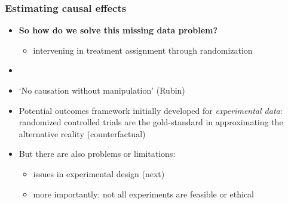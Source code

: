 \begin{frame}
\frametitle{Estimating causal effects}
\centering

\begin{itemize}
  \item \textbf{So how do we solve this missing data problem?}
  \begin{itemize}
    \item intervening in treatment assignment through randomization
  \end{itemize}
  \item[]
  \item<2-> `No causation without manipulation' (Rubin)
  \item<2-> Potential outcomes framework initially developed for \textit{experimental data}: randomized controlled trials are the gold-standard in approximating the alternative reality (counterfactual)
  \item<2-> But there are also problems or limitations:
  \begin{itemize}
    \item issues in experimental design (next)
    \item more importantly: not all experiments are feasible or ethical
  \end{itemize}
\end{itemize}

\end{frame}
\note{}

%
%

